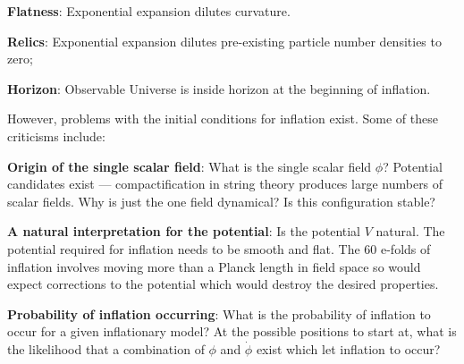 \begin{hangparas}{24pt}{1}
	\textbf{Flatness}:
	Exponential expansion dilutes curvature.

	\textbf{Relics}:
	Exponential expansion dilutes pre-existing particle number densities to zero;

	\textbf{Horizon}:
	Observable Universe is inside horizon at the beginning of inflation.
\end{hangparas}

\noindent
However, problems with the initial conditions for inflation exist.
Some of these criticisms include:

\begin{hangparas}{24pt}{1}
	\textbf{Origin of the single scalar field}:
	What is the single scalar field \({\phi}\)? Potential candidates exist --- compactification in string theory produces large numbers of scalar fields.
	Why is just the one field dynamical? Is this configuration stable?

	\textbf{A natural interpretation for the potential}:
	Is the potential \(V\) natural.
	The potential required for inflation needs to be smooth and flat.
	The \(\num{60}\) e-folds of inflation involves moving more than a Planck length in field space so would expect corrections to the potential which would destroy the desired properties.

	\textbf{Probability of inflation occurring}:
	What is the probability of inflation to occur for a given inflationary model? At the possible positions to start at, what is the likelihood that a combination of \({\phi}\) and \(\dot{\phi}\) exist which let inflation to occur?
\end{hangparas}
